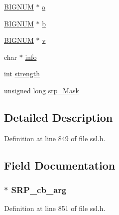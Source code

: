 \begin{DoxyCompactItemize}
\item 
\hyperlink{crypto_2ossl__typ_8h_a6fb19728907ec6515e4bfb716bffa141}{B\+I\+G\+N\+UM} $\ast$ \hyperlink{structsrp__ctx__st_a2e67c857a6d3ab552fcf1269a040c20f}{a}
\item 
\hyperlink{crypto_2ossl__typ_8h_a6fb19728907ec6515e4bfb716bffa141}{B\+I\+G\+N\+UM} $\ast$ \hyperlink{structsrp__ctx__st_a4f9b0f3e3a494b67b819fb0fb31e6eca}{b}
\item 
\hyperlink{crypto_2ossl__typ_8h_a6fb19728907ec6515e4bfb716bffa141}{B\+I\+G\+N\+UM} $\ast$ \hyperlink{structsrp__ctx__st_a449bad7793a9afed36db8c4ef3a71a41}{v}
\item 
char $\ast$ \hyperlink{structsrp__ctx__st_abd59b785f164cf0a2612687a73c5e81d}{info}
\item 
int \hyperlink{structsrp__ctx__st_af0114dc9171a9bdc183e54e510bd861d}{strength}
\item 
unsigned long \hyperlink{structsrp__ctx__st_ae86899fd34e812bcbf65e3e60fc52894}{srp\+\_\+\+Mask}
\end{DoxyCompactItemize}


\subsection{Detailed Description}


Definition at line 849 of file ssl.\+h.



\subsection{Field Documentation}
\subsubsection[{\texorpdfstring{S\+R\+P\+\_\+cb\+\_\+arg}{SRP_cb_arg}}]{ $\ast$ S\+R\+P\+\_\+cb\+\_\+arg}\hypertarget{structsrp__ctx__st_af4421fd99ff06bf892c397584acdf1d5}{}\label{structsrp__ctx__st_af4421fd99ff06bf892c397584acdf1d5}


Definition at line 851 of file ssl.\+h.

